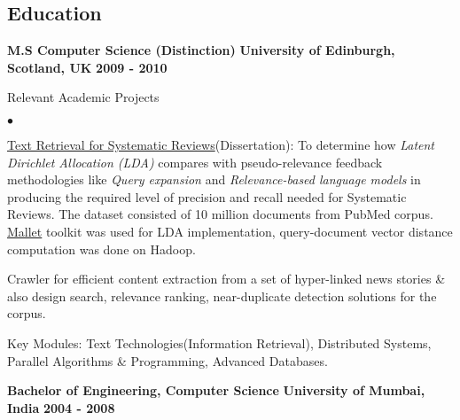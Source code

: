 \documentclass[margin,centered,11pt]{res}
\newenvironment{list1}{
  \begin{list}{\ding{113}}{%
      \setlength{\itemsep}{0in}
      \setlength{\parsep}{0in} \setlength{\parskip}{0in}
      \setlength{\topsep}{0in} \setlength{\partopsep}{0in} 
      \setlength{\leftmargin}{0.17in}}}{\end{list}}
\newenvironment{list2}{
  \begin{list}{$\bullet$}{%
      \setlength{\itemsep}{0in}
      \setlength{\parsep}{0in} \setlength{\parskip}{0in}
      \setlength{\topsep}{0in} \setlength{\partopsep}{0in} 
      \setlength{\leftmargin}{0.2in}}}{\end{list}}
\begin{document}
\begin{resume}
\section{\sc Education}
\textbf{M.S Computer Science (Distinction)} \newline
\textbf{University of Edinburgh, Scotland, UK} \hfill \textbf{2009 - 2010} \newline
\begin{list1}
\item[] Relevant Academic Projects
\begin{list2}
\vspace{+.05in}
\item \href{http://www.inf.ed.ac.uk/publications/thesis/online/IM100900.pdf}{Text Retrieval for Systematic Reviews}(Dissertation): To determine how \textit{Latent Dirichlet Allocation (LDA)} compares with pseudo-relevance feedback methodologies like \textit{Query expansion} and \textit{Relevance-based language models} in producing the required level of precision and recall needed for Systematic Reviews. The dataset consisted of 10 million documents from PubMed corpus. \href{http://mallet.cs.umass.edu/}{Mallet} toolkit was used for LDA implementation, query-document vector distance computation was done on Hadoop.
\item Crawler for efficient content extraction from a set of hyper-linked news stories \& also design search, relevance ranking, near-duplicate detection solutions for the corpus.
\end{list2}
\vspace{+.05in}
\item[] Key Modules: Text Technologies(Information Retrieval), Distributed Systems, Parallel Algorithms \& Programming, Advanced Databases.
\end{list1}

\textbf{Bachelor of Engineering, Computer Science }\newline
\textbf{University of Mumbai, India} \hfill {\bf 2004 - 2008}\newline

\end{resume}
\end{document}
